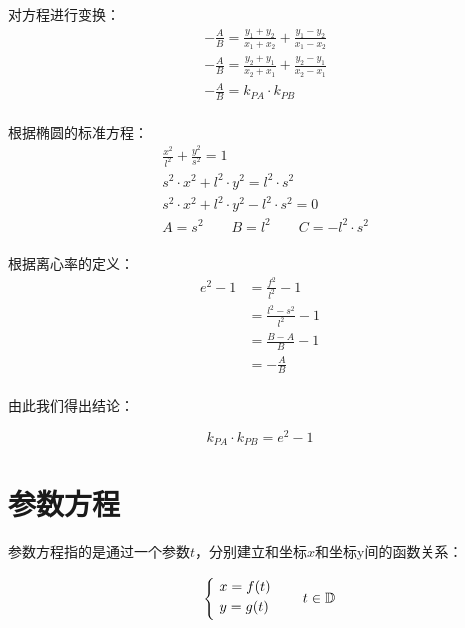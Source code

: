 \documentclass[UTF8]{ctexart}
\begin{document}
    对方程进行变换：
    \begin{align}
        &-\frac{A}{B}=\frac{y_1+y_2}{x_1+x_2}+\frac{y_1-y_2}{x_1-x_2}\\[4mm]
        &-\frac{A}{B}=\frac{y_2+y_1}{x_2+x_1}+\frac{y_2-y_1}{x_2-x_1}\\[4mm]
        &-\frac{A}{B}=k_{PA}\cdot k_{PB}
    \end{align}\\
    根据椭圆的标准方程：
    \begin{align}
        &\frac{x^2}{l^2}+\frac{y^2}{s^2}=1\\[3mm]
        &s^2\cdot x^2+l^2\cdot y^2=l^2\cdot s^2\\[3mm]
        &s^2\cdot x^2+l^2\cdot y^2-l^2\cdot s^2=0\\[3mm]
        &A=s^2\qquad B=l^2\qquad C=-l^2\cdot s^2
    \end{align}\\
    根据离心率的定义：
    \begin{align}
        e^2-1
        &=\frac{f^2}{l^2}-1\\[3mm]
        &=\frac{l^2-s^2}{l^2}-1\\[3mm]
        &=\frac{B-A}{B}-1\\[3mm]
        &=-\frac{A}{B}
    \end{align}\\
    由此我们得出结论：
    \begin{large}
        \begin{equation*}
            k_{PA}\cdot k_{PB}=e^2-1
        \end{equation*}
    \end{large}



\newpage

\section{参数方程}
    参数方程指的是通过一个参数$t$，分别建立和坐标$x$和坐标y间的函数关系：\\
    \begin{large}
        \begin{equation*}
            ~~~~\begin{cases}
                ~x=f(t)\\
                ~y=g(t)\vspace{3pt}
            \end{cases}\quad t\in\mathbb{D}
        \end{equation*}
    \end{large}\\
\end{document}
